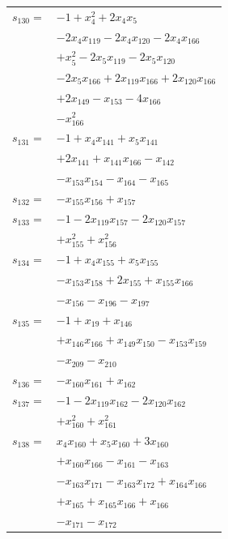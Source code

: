 \begin{longtable}{@{}r@{\;}l@{}}
\(s_{130}=\) & \(\displaystyle -1 +x_{4}^{2} +2x_{4}x_{5}\) \\
 & \(\displaystyle -2x_{4}x_{119} -2x_{4}x_{120} -2x_{4}x_{166}\) \\
 & \(\displaystyle +x_{5}^{2} -2x_{5}x_{119} -2x_{5}x_{120}\) \\
 & \(\displaystyle -2x_{5}x_{166} +2x_{119}x_{166} +2x_{120}x_{166}\) \\
 & \(\displaystyle +2x_{149} -x_{153} -4x_{166}\) \\
 & \(\displaystyle -x_{166}^{2}\) \\[3pt]
\(s_{131}=\) & \(\displaystyle -1 +x_{4}x_{141} +x_{5}x_{141}\) \\
 & \(\displaystyle +2x_{141} +x_{141}x_{166} -x_{142}\) \\
 & \(\displaystyle -x_{153}x_{154} -x_{164} -x_{165}\) \\[3pt]
\(s_{132}=\) & \(\displaystyle -x_{155}x_{156} +x_{157}\) \\[3pt]
\(s_{133}=\) & \(\displaystyle -1 -2x_{119}x_{157} -2x_{120}x_{157}\) \\
 & \(\displaystyle +x_{155}^{2} +x_{156}^{2}\) \\[3pt]
\(s_{134}=\) & \(\displaystyle -1 +x_{4}x_{155} +x_{5}x_{155}\) \\
 & \(\displaystyle -x_{153}x_{158} +2x_{155} +x_{155}x_{166}\) \\
 & \(\displaystyle -x_{156} -x_{196} -x_{197}\) \\[3pt]
\(s_{135}=\) & \(\displaystyle -1 +x_{19} +x_{146}\) \\
 & \(\displaystyle +x_{146}x_{166} +x_{149}x_{150} -x_{153}x_{159}\) \\
 & \(\displaystyle -x_{209} -x_{210}\) \\[3pt]
\(s_{136}=\) & \(\displaystyle -x_{160}x_{161} +x_{162}\) \\[3pt]
\(s_{137}=\) & \(\displaystyle -1 -2x_{119}x_{162} -2x_{120}x_{162}\) \\
 & \(\displaystyle +x_{160}^{2} +x_{161}^{2}\) \\[3pt]
\(s_{138}=\) & \(\displaystyle x_{4}x_{160} +x_{5}x_{160} +3x_{160}\) \\
 & \(\displaystyle +x_{160}x_{166} -x_{161} -x_{163}\) \\
 & \(\displaystyle -x_{163}x_{171} -x_{163}x_{172} +x_{164}x_{166}\) \\
 & \(\displaystyle +x_{165} +x_{165}x_{166} +x_{166}\) \\
 & \(\displaystyle -x_{171} -x_{172}\) \\[3pt]

\end{longtable}
